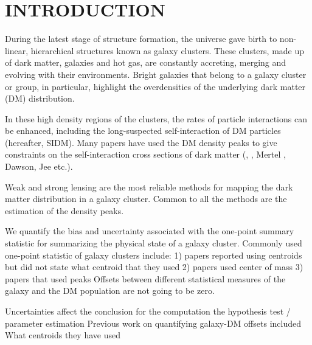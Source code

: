 
\section{INTRODUCTION} 
During the latest stage of structure formation, the universe gave birth to
non-linear, hierarchical structures known as galaxy clusters. 
These clusters, made up of dark matter, galaxies and hot gas,
are constantly accreting, merging and evolving with their
environments. Bright galaxies that belong to a galaxy cluster or group, in 
particular, highlight the overdensities of the underlying dark matter (DM) 
distribution. 


In these high density regions of the clusters, the rates of particle
interactions can be enhanced, including the long-suspected self-interaction of DM
particles (hereafter, SIDM). 
Many papers have used the DM density peaks to give constraints on 
the self-interaction cross
sections of dark matter (\citealt{Markevitch2004}, \citealt{Bradac2006b}, Mertel , Dawson, Jee etc.). 


Weak and strong lensing are the most reliable methods for mapping the dark 
matter distribution in a galaxy cluster. 
Common to all the methods are the estimation of the density peaks. 





We quantify the bias and uncertainty associated with the one-point summary
statistic for summarizing the physical state of a galaxy cluster. 
Commonly used one-point statistic of galaxy clusters include:
1) papers reported using centroids but did not state what centroid that they
used 
2) papers used center of mass 
3) papers that used peaks \citep{Robertson2016} 
Offsets between different statistical measures of the galaxy and the DM
population are not going to be zero.

Uncertainties affect the conclusion for the computation the hypothesis test / parameter
estimation
Previous work on quantifying galaxy-DM offsets included  
What centroids they have used

